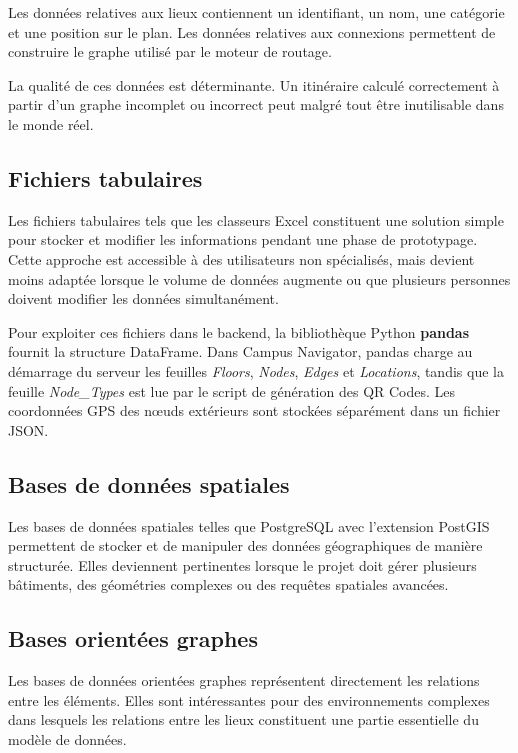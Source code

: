 \documentclass[12pt,a4paper]{report}
\begin{document}
Les données relatives aux lieux contiennent un identifiant, un nom, une catégorie et une position
sur le plan. Les données relatives aux connexions permettent de construire le graphe utilisé par le
moteur de routage.

La qualité de ces données est déterminante. Un itinéraire calculé correctement à partir d'un graphe
incomplet ou incorrect peut malgré tout être inutilisable dans le monde réel.

\subsection{Fichiers tabulaires}

Les fichiers tabulaires tels que les classeurs Excel constituent une solution simple pour stocker et
modifier les informations pendant une phase de prototypage. Cette approche est accessible à des
utilisateurs non spécialisés, mais devient moins adaptée lorsque le volume de données augmente ou
que plusieurs personnes doivent modifier les données simultanément.

Pour exploiter ces fichiers dans le backend, la bibliothèque Python \textbf{pandas} fournit la
structure DataFrame. Dans Campus Navigator, pandas charge au démarrage du serveur les feuilles
\emph{Floors}, \emph{Nodes}, \emph{Edges} et \emph{Locations}, tandis que la feuille
\emph{Node\_Types} est lue par le script de génération des QR Codes. Les coordonnées GPS des nœuds
extérieurs sont stockées séparément dans un fichier JSON.

\subsection{Bases de données spatiales}

Les bases de données spatiales telles que PostgreSQL avec l'extension PostGIS permettent de stocker
et de manipuler des données géographiques de manière structurée. Elles deviennent pertinentes
lorsque le projet doit gérer plusieurs bâtiments, des géométries complexes ou des requêtes
spatiales avancées.

\subsection{Bases orientées graphes}

Les bases de données orientées graphes représentent directement les relations entre les éléments.
Elles sont intéressantes pour des environnements complexes dans lesquels les relations entre les
lieux constituent une partie essentielle du modèle de données.
\end{document}
